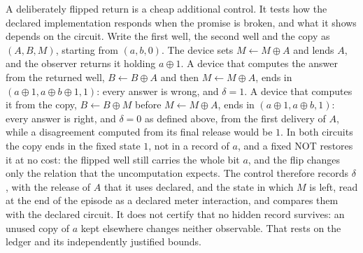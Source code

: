 A deliberately flipped return is a cheap additional control. It tests how the declared implementation responds when the promise is broken, and what it shows depends on the circuit. Write the first well, the second well and the copy as $(A,B,M)$, starting from $(a,b,0)$. The device sets $M\leftarrow M\oplus A$ and lends $A$, and the observer returns it holding $a\oplus1$. A device that computes the answer from the returned well, $B\leftarrow B\oplus A$ and then $M\leftarrow M\oplus A$, ends in $(a\oplus1,a\oplus b\oplus1,1)$: every answer is wrong, and $\delta=1$. A device that computes it from the copy, $B\leftarrow B\oplus M$ before $M\leftarrow M\oplus A$, ends in $(a\oplus1,a\oplus b,1)$: every answer is right, and $\delta=0$ as defined above, from the first delivery of $A$, while a disagreement computed from its final release would be $1$. In both circuits the copy ends in the fixed state $1$, not in a record of $a$, and a fixed NOT restores it at no cost: the flipped well still carries the whole bit $a$, and the flip changes only the relation that the uncomputation expects. The control therefore records $\delta$, with the release of $A$ that it uses declared, and the state in which $M$ is left, read at the end of the episode as a declared meter interaction, and compares them with the declared circuit. It does not certify that no hidden record survives: an unused copy of $a$ kept elsewhere changes neither observable. That rests on the ledger and its independently justified bounds.

